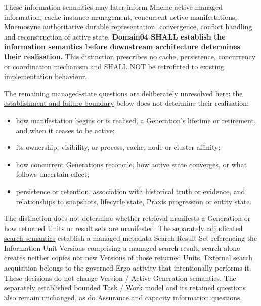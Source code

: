 These information semantics may later inform Mneme active managed information,
cache-instance management, concurrent active manifestations, Mnemosyne
authoritative durable representation, convergence, conflict handling and
reconstruction of active state. \textbf{Domain04 SHALL establish the information
semantics before downstream architecture determines their realisation.} This
distinction prescribes no cache, persistence, concurrency or coordination
mechanism and SHALL NOT be retrofitted to existing implementation behaviour.



The remaining managed-state questions are deliberately unresolved here; the
\href{\detokenize{../../../../../docs/markdown/04-information-architecture/metamodel/information-architecture-metamodel.md#656-establishment-and-semantic-indivisibility}}{establishment and failure boundary}
below does not determine their realisation:



\begin{itemize}


\item how manifestation begins or is realised, a Generation's lifetime or retirement,
  and when it ceases to be active;

\item its ownership, visibility, or process, cache, node or cluster affinity;

\item how concurrent Generations reconcile, how active state converges, or what
  follows uncertain effect;

\item persistence or retention, association with historical truth or evidence,
  and relationships to snapshots, lifecycle state, Praxis progression or
  entity state.

\end{itemize}


The distinction does not determine whether retrieval manifests a Generation
or how returned Units or result sets are manifested. The separately adjudicated
\href{\detokenize{../../../../../docs/markdown/04-information-architecture/patterns/search-results.md}}{search semantics} establish a managed metadata
Search Result Set referencing the Information Unit Versions comprising a
managed search result; search alone creates neither copies nor new Versions
of those returned Units. External search acquisition belongs to the governed
Ergo activity that intentionally performs it. These decisions do not change
Version / Active Generation semantics. The separately established
\href{\detokenize{../../../../../docs/markdown/04-information-architecture/information-families/task-work.md}}{bounded Task / Work model} and its
retained questions also remain unchanged, as do Assurance and capacity
information questions.



